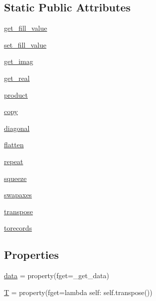\subsection*{Static Public Attributes}
\begin{DoxyCompactItemize}
\item 
\hyperlink{classnumpy_1_1ma_1_1core_1_1MaskedArray_a6edd8de8a4913eaa5a3fadbffe67cc36}{get\+\_\+fill\+\_\+value}
\item 
\hyperlink{classnumpy_1_1ma_1_1core_1_1MaskedArray_ab6365a2edb4df2a992737841c918a4a6}{set\+\_\+fill\+\_\+value}
\item 
\hyperlink{classnumpy_1_1ma_1_1core_1_1MaskedArray_a31bbda1c941d3a5cc11a5024035b37e4}{get\+\_\+imag}
\item 
\hyperlink{classnumpy_1_1ma_1_1core_1_1MaskedArray_a7241cc15ff912a143c60cbbcfa398956}{get\+\_\+real}
\item 
\hyperlink{classnumpy_1_1ma_1_1core_1_1MaskedArray_a90fc31ab6706fb0d06afe525f7674f54}{product}
\item 
\hyperlink{classnumpy_1_1ma_1_1core_1_1MaskedArray_a2d8023d4e0400e07cbffbc8a60e0a418}{copy}
\item 
\hyperlink{classnumpy_1_1ma_1_1core_1_1MaskedArray_a69bd8e1b6f5eacc08a223630f39c402a}{diagonal}
\item 
\hyperlink{classnumpy_1_1ma_1_1core_1_1MaskedArray_a5179b52dbabc58e3aa6b57e46c6d59be}{flatten}
\item 
\hyperlink{classnumpy_1_1ma_1_1core_1_1MaskedArray_ac200e4a19a8905c31f86a775b68d6438}{repeat}
\item 
\hyperlink{classnumpy_1_1ma_1_1core_1_1MaskedArray_abff33f769ede793fd49d9a493846da9c}{squeeze}
\item 
\hyperlink{classnumpy_1_1ma_1_1core_1_1MaskedArray_a301fc6f129905ac6696c2f604d4fd06b}{swapaxes}
\item 
\hyperlink{classnumpy_1_1ma_1_1core_1_1MaskedArray_ae4cf92c713f5b8818e73fcb3ddb3145d}{transpose}
\item 
\hyperlink{classnumpy_1_1ma_1_1core_1_1MaskedArray_a0d27c91ccbca4623b31b2e358ff6d105}{torecords}
\end{DoxyCompactItemize}
\subsection*{Properties}
\begin{DoxyCompactItemize}
\item 
\hyperlink{classnumpy_1_1ma_1_1core_1_1MaskedArray_a2d6c6c9dbd568a0ea5140111887cf652}{data} = property(fget=\+\_\+get\+\_\+data)
\item 
\hyperlink{classnumpy_1_1ma_1_1core_1_1MaskedArray_aa6b8deec1ef735381ab9342787d4271b}{T} = property(fget=lambda self\+: self.\+transpose())
\end{DoxyCompactItemize}


